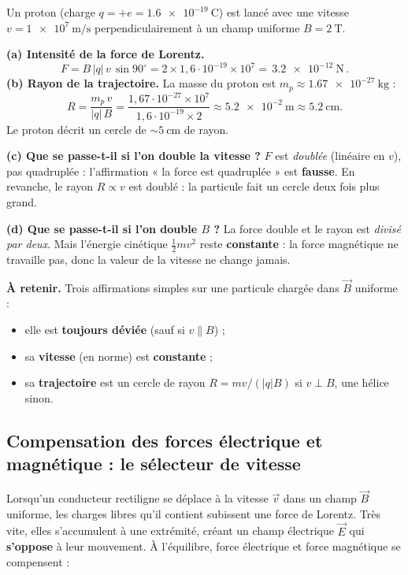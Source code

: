 \documentclass[11pt,a4paper]{article}
\newcommand{\Bvec}{\vec{B}}
\newcommand{\vvec}{\vec{v}}
\newcommand{\Evec}{\vec{E}}
\begin{document}
\begin{exemple}
Un proton (charge $q=+e=\SI{1.6e-19}{\coulomb}$) est lancé avec une vitesse $v=\SI{1e7}{\metre\per\second}$
perpendiculairement à un champ uniforme $B=\SI{2}{\tesla}$.

\smallskip
\textbf{(a) Intensité de la force de Lorentz.}
\[ F = B\,|q|\,v\,\sin 90^\circ = 2\times 1{,}6\cdot 10^{-19}\times 10^{7}
     = \boxed{\,\SI{3.2e-12}{\newton}\,}. \]
\textbf{(b) Rayon de la trajectoire.} La masse du proton est $m_p\approx\SI{1.67e-27}{\kilogram}$ :
\[ R = \dfrac{m_p\, v}{|q|\, B}
     = \dfrac{1{,}67\cdot 10^{-27}\times 10^7}{1{,}6\cdot 10^{-19}\times 2}
     \approx \SI{5.2e-2}{\metre} \approx \SI{5.2}{\centi\metre}. \]
Le proton décrit un cercle de $\sim\SI{5}{\centi\metre}$ de rayon.

\textbf{(c) Que se passe-t-il si l'on double la vitesse ?} $F$ est \emph{doublée} (linéaire en $v$),
pas quadruplée : l'affirmation « la force est quadruplée » est \textbf{fausse}. En revanche, le rayon
$R\propto v$ est doublé : la particule fait un cercle deux fois plus grand.

\textbf{(d) Que se passe-t-il si l'on double $B$ ?} La force double et le rayon est \emph{divisé par
deux}. Mais l'énergie cinétique $\tfrac12 m v^2$ reste \textbf{constante} : la force magnétique ne
travaille pas, donc la valeur de la vitesse ne change jamais.

\textbf{À retenir.} Trois affirmations simples sur une particule chargée dans $\Bvec$ uniforme :
\begin{itemize}[leftmargin=1.6em,topsep=2pt,itemsep=1pt]
  \item elle est \textbf{toujours déviée} (sauf si $v\parallel B$) ;
  \item sa \textbf{vitesse} (en norme) est \textbf{constante} ;
  \item sa \textbf{trajectoire} est un cercle de rayon $R=mv/(|q|B)$ si $v\perp B$, une hélice sinon.
\end{itemize}
\end{exemple}

\subsection{Compensation des forces électrique et magnétique : le sélecteur de vitesse}

Lorsqu'un conducteur rectiligne se déplace à la vitesse $\vvec$ dans un champ $\Bvec$ uniforme, les
charges libres qu'il contient subissent une force de Lorentz. Très vite, elles s'accumulent à une
extrémité, créant un champ électrique $\Evec$ qui \textbf{s'oppose} à leur mouvement. À l'équilibre,
force électrique et force magnétique se compensent :
\end{document}
